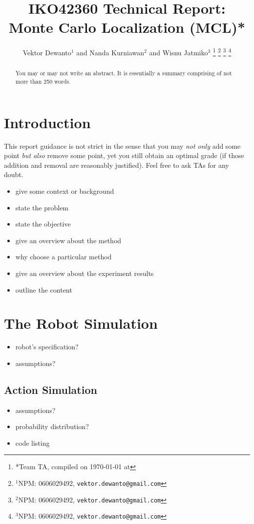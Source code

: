 \documentclass[letterpaper, 10 pt, conference]{ieeeconf}  %
\title{\LARGE \bf
IKO42360 Technical Report: Monte Carlo Localization (MCL)*
}
\author{Vektor Dewanto$^{1}$ and Nanda Kurniawan$^{2}$ and Wisnu Jatmiko$^{3}$  %
\thanks{*Team TA, compiled on {\ddmmyyyydate\today} at \currenttime}%
\thanks{$^{1}$NPM: 0606029492,
        {\tt\small vektor.dewanto@gmail.com}}%
\thanks{$^{2}$NPM: 0606029492,
        {\tt\small vektor.dewanto@gmail.com}}%
\thanks{$^{3}$NPM: 0606029492,
        {\tt\small vektor.dewanto@gmail.com}}%
}
\begin{document}
\maketitle
\thispagestyle{empty}
\pagestyle{empty}

\begin{abstract}
You may or may not write an abstract.
It is essentially a summary comprising of not more than 250 words.
\end{abstract}

\section{Introduction}
This report guidance is not strict in the sense that you may \emph{not only} add some point \emph{but also} remove some point, yet you still obtain an optimal grade (if those addition and removal are reasonably justified).
Feel free to ask TAs for any doubt.

\begin{itemize}
    \item give some context or background
    \item state the problem
    \item state the objective
    \item give an overview about the method
    \item why choose a particular method
    \item give an overview about the experiment results
    \item outline the content
\end{itemize}

\section{The Robot Simulation}
\begin{itemize}
\item robot's specification?
\item assumptions?
\end{itemize}
\subsection{Action Simulation}
\begin{itemize}
\item assumptions?
\item probability distribution?
\item code listing
\end{itemize}
\end{document}
